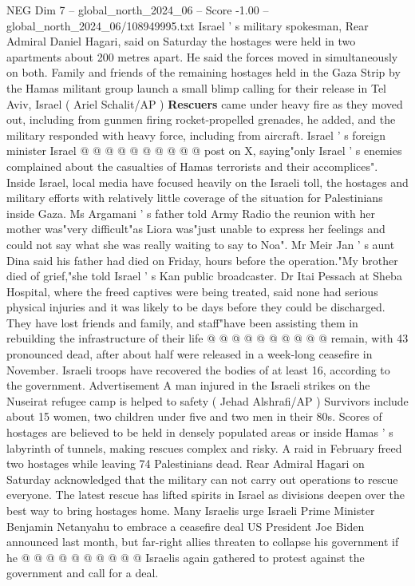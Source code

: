 \begin{textsample}{NEG Dim 7 – global\_north\_2024\_06 – Score -1.00 – global\_north\_2024\_06/108949995.txt}
Israel ' s military spokesman, Rear Admiral Daniel Hagari, said on Saturday the hostages were held in two apartments about 200 metres apart.
He said the forces moved in simultaneously on both.
Family and friends of the remaining hostages held in the Gaza Strip by the Hamas militant group launch a small blimp calling for their release in Tel Aviv, Israel ( Ariel Schalit/AP ) \textbf{Rescuers} came under heavy fire as they moved out, including from gunmen firing rocket-propelled grenades, he added, and the military responded with heavy force, including from aircraft.
Israel ' s foreign minister Israel @ @ @ @ @ @ @ @ @ @ post on X, saying"only Israel ' s enemies complained about the casualties of Hamas terrorists and their accomplices".
Inside Israel, local media have focused heavily on the Israeli toll, the hostages and military efforts with relatively little coverage of the situation for Palestinians inside Gaza.
Ms Argamani ' s father told Army Radio the reunion with her mother was"very difficult"as Liora was"just unable to express her feelings and could not say what she was really waiting to say to Noa".
Mr Meir Jan ' s aunt Dina said his father had died on Friday, hours before the operation."My brother died of grief,"she told Israel ' s Kan public broadcaster.
Dr Itai Pessach at Sheba Hospital, where the freed captives were being treated, said none had serious physical injuries and it was likely to be days before they could be discharged.
They have lost friends and family, and staff"have been assisting them in rebuilding the infrastructure of their life @ @ @ @ @ @ @ @ @ @ remain, with 43 pronounced dead, after about half were released in a week-long ceasefire in November.
Israeli troops have recovered the bodies of at least 16, according to the government.
Advertisement A man injured in the Israeli strikes on the Nuseirat refugee camp is helped to safety ( Jehad Alshrafi/AP ) Survivors include about 15 women, two children under five and two men in their 80s.
Scores of hostages are believed to be held in densely populated areas or inside Hamas ' s labyrinth of tunnels, making rescues complex and risky.
A raid in February freed two hostages while leaving 74 Palestinians dead.
Rear Admiral Hagari on Saturday acknowledged that the military can not carry out operations to rescue everyone.
The latest rescue has lifted spirits in Israel as divisions deepen over the best way to bring hostages home.
Many Israelis urge Israeli Prime Minister Benjamin Netanyahu to embrace a ceasefire deal US President Joe Biden announced last month, but far-right allies threaten to collapse his government if he @ @ @ @ @ @ @ @ @ @ Israelis again gathered to protest against the government and call for a deal.

\end{textsample}
